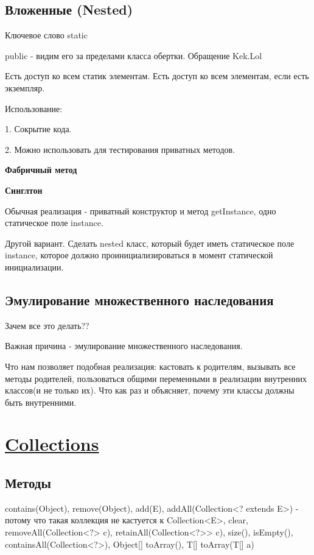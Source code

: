 \documentclass{article}
\begin{document}
\subsection{Вложенные (Nested)}

Ключевое слово static

public - видим его за пределами класса обертки. Обращение Kek.Lol

Есть доступ ко всем статик элементам. Есть доступ ко всем элементам, если есть экземпляр.

Использование:

1. Сокрытие кода.

2. Можно использовать для тестирования приватных методов.

\textbf{Фабричный метод}

\textbf{Синглтон}

Обычная реализация - приватный конструктор и метод getInstance, одно статическое поле instance.

Другой вариант. Сделать nested класс, который будет иметь статическое поле instance, которое должно проинициализироваться в момент статической инициализации.

\subsection{Эмулирование множественного наследования}

Зачем все это делать??

Важная причина - эмулирование множественного наследования.

Что нам позволяет подобная реализация: кастовать к родителям, вызывать все методы родителей, пользоваться общими переменными в реализации внутренних классов(и не только их). Что как раз и объясняет, почему эти классы должны быть внутренними.

\section{\underline{Collections}}

\subsection{Методы}

contains(Object), remove(Object), add(E), addAll(Collection<? extends E>) - потому что такая коллекция не кастуется к Collection<E>, clear, removeAll(Collection<?> c), retainAll(Collection<?>> c), size(), isEmpty(), containsAll(Collection<?>), Object[] toArray(), T[] toArray(T[] a)
\end{document}
